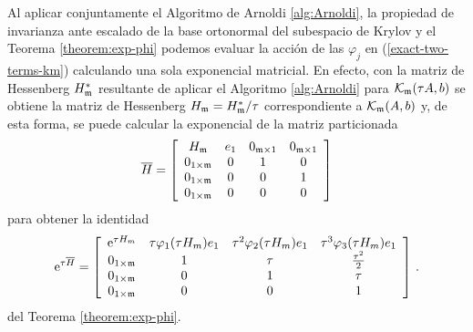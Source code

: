 Al aplicar conjuntamente el Algoritmo de Arnoldi \ref{alg:Arnoldi}, la propiedad de invarianza ante escalado de la base ortonormal del subespacio de Krylov y el Teorema \ref{theorem:exp-phi} podemos evaluar la acción de las $\varphi_j$ en (\ref{exact-two-terms-km}) calculando una sola exponencial matricial. En efecto, con la matriz de Hessenberg $H^*_{\mathfrak{m}}$ resultante de aplicar el Algoritmo \ref{alg:Arnoldi} para $\mathcal{K}_{\mathfrak{m}}(\tau A,b)$ se obtiene la matriz de Hessenberg $H_{\mathfrak{m}}=H^*_{\mathfrak{m}}/\tau$ correspondiente a $\mathcal{K}_{\mathfrak{m}}(A,b)$ y, de esta forma, se puede calcular la exponencial de la matriz particionada
\begin{equation}
    \overline{H} = \left[\begin{array}{cccc}
    H_{\mathfrak{m}} & e_1 & 0_{\mathfrak{m}\times 1} & 0_{\mathfrak{m}\times 1}\\
    0_{1\times\mathfrak{m}} & 0 & 1 & 0\\
    0_{1\times\mathfrak{m}} & 0 & 0 & 1\\
    0_{1\times\mathfrak{m}} & 0 & 0 & 0
    \end{array}\right] \label{hhat_hessenberg_matrix}
    \end{equation}
para obtener la identidad
\begin{equation}
    \mathrm{e}^{\tau\overline{H}} = \left[\begin{array}{cccc}
    \mathrm{e}^{\tau H_m} & \tau\varphi_1(\tau H_m)e_1 & \tau^{2}\varphi_2(\tau H_m)e_1 &
    \tau^{3}\varphi_3(\tau H_m)e_1 \\
    \textcolor{black}{0_{1\times\mathfrak{m}}} & 1 & \tau & \frac{\tau^{2}}{2}\\
    \textcolor{black}{0_{1\times\mathfrak{m}}} & 0 & 1 & \tau \\
    \textcolor{black}{0_{1\times\mathfrak{m}}} & 0 & 0 & 1 \\
    \end{array}\right] \,. \label{phi_hhat_exponential}
\end{equation}
del Teorema \ref{theorem:exp-phi}.

